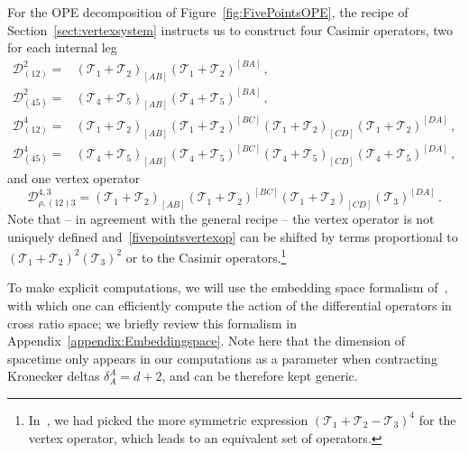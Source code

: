 \documentclass{article}
\begin{document}
	For the OPE decomposition of Figure~\ref{fig:FivePointsOPE}, the recipe of Section~\ref{sect:vertexsystem} instructs us to construct four Casimir operators, two for each internal leg
	\begin{align}
		\mathcal{D}^{2}_{(12)}=&\left(\mathcal{T}_1+\mathcal{T}_2\right)_{[AB]}\left(\mathcal{T}_1+\mathcal{T}_2\right)^{[BA]}\,,\label{fivepointsQuadCasimir12}\\
		\mathcal{D}^{2}_{(45)}=&\left(\mathcal{T}_4+\mathcal{T}_5\right)_{[AB]}\left(\mathcal{T}_4+\mathcal{T}_5\right)^{[BA]}\,,\label{fivepointsQuadCasimir45}\\
		\mathcal{D}^{4}_{(12)}=&\left(\mathcal{T}_1+\mathcal{T}_2\right)_{[AB]}\left(\mathcal{T}_1+\mathcal{T}_2\right)^{[BC]}\left(\mathcal{T}_1+\mathcal{T}_2\right)_{[CD]}\left(\mathcal{T}_1+\mathcal{T}_2\right)^{[DA]}\,,\\
		\mathcal{D}^{4}_{(45)}=&\left(\mathcal{T}_4+\mathcal{T}_5\right)_{[AB]}\left(\mathcal{T}_4+\mathcal{T}_5\right)^{[BC]}\left(\mathcal{T}_4+\mathcal{T}_5\right)_{[CD]}\left(\mathcal{T}_4+\mathcal{T}_5\right)^{[DA]}\,,
	\end{align}
	and one vertex operator
	\begin{equation}
	    \mathcal{D}_{\rho,(12)3}^{4,3}=\left(\mathcal{T}_1+\mathcal{T}_2\right)_{[AB]}\left(\mathcal{T}_1+\mathcal{T}_2\right)^{[BC]}\left(\mathcal{T}_1+\mathcal{T}_2\right)_{[CD]}\left(\mathcal{T}_3\right)^{[DA]}\,.
	    \label{fivepointsvertexop}
	\end{equation}
	Note that -- in agreement with the general recipe -- the vertex operator is not uniquely defined  and~\eqref{fivepointsvertexop}  can be shifted by terms proportional to $(\mathcal{T}_1+\mathcal{T}_2)^2(\mathcal{T}_3)^2$ or to the Casimir operators.\footnote{In~\cite{Buric:2020dyz}, we had picked the more symmetric expression $(\mathcal{T}_1+\mathcal{T}_2-\mathcal{T}_3)^4$ for the vertex operator, which leads to an equivalent set of operators.} 
	
	
	To make explicit computations, we will use the embedding space formalism of~\cite{Costa:2011mg}, with which one can efficiently compute the action of the differential operators in cross ratio space; we briefly review this formalism in Appendix~\ref{appendix:Embeddingspace}. Note here that the dimension of spacetime only appears in our computations as a parameter when contracting Kronecker deltas $\delta^A_A=d+2$, and can be therefore kept generic.
	
\end{document}
